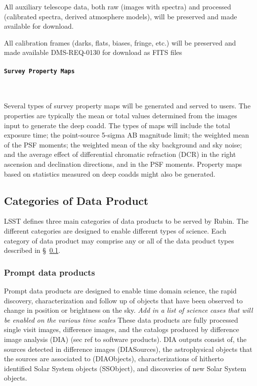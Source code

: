 All auxiliary telescope data, both raw (images with spectra) and processed (calibrated spectra,
derived atmosphere models), will be preserved and made available for download.

All calibration frames (darks, flats, biases, fringe, etc.) will be preserved and made available DMS-REQ-0130
for download as FITS files

\paragraph {\tt  Survey Property Maps}~

Several types of survey property maps will be generated and served to users. 
The properties are typically the mean or total values determined from the images input to generate the deep coadd. 
The types of maps will include the total exposure time; the point-source 5-sigma AB magnitude limit; the weighted mean of the PSF moments; the weighted mean of the sky background and sky noise; and the average effect of differential chromatic refraction (DCR) in the
right ascension and declination directions, and in the PSF moments. 
Property maps based on statistics measured on deep coadds might also be generated.



\subsection{Categories of Data Product} \label{sec:dp-categories}
LSST defines three main categories of data products to be served by Rubin.
The different categories are designed to enable different types of science.
Each category of data product may comprise any or all of the data product types described in \S~\ref{sec:dp-categories}.

\subsubsection{Prompt data products} \label{sec:dp-prompt}
Prompt data products are designed to enable time domain science, the rapid discovery, characterization and follow up of objects that have been observed to change in position or brightness on the sky.
{\it Add in a list of science cases that will be enabled on the various time scales}
These data products are fully processed single visit images, difference images, and the catalogs produced by difference image analysis (DIA)  (sec ref to software products).
DIA outputs consist of,  the sources detected in difference images (DIASources), the astrophysical objects that the sources are associated to (DIAObjects),
characterizations of hitherto identified Solar System objects (SSObject), and discoveries of new Solar System objects.

